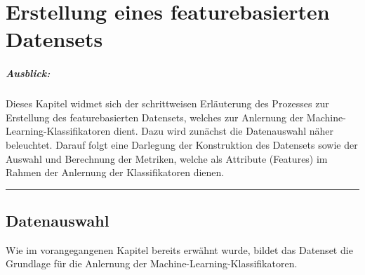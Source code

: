 
\chapter{Erstellung eines featurebasierten Datensets}

\paragraph{Ausblick:}
Dieses Kapitel widmet sich der schrittweisen Erläuterung des Prozesses zur Erstellung des featurebasierten Datensets, welches zur Anlernung der Machine-Learning-Klassifikatoren dient. Dazu wird zunächst die Datenauswahl näher beleuchtet. Darauf folgt eine Darlegung der Konstruktion des Datensets sowie der Auswahl und Berechnung der Metriken, welche als Attribute (Features) im Rahmen der Anlernung der Klassifikatoren dienen.
\\
\hrule

\section{Datenauswahl}

Wie im vorangegangenen Kapitel bereits erwähnt wurde, bildet das Datenset die Grundlage für die Anlernung der Machine-Learning-Klassifikatoren. 





